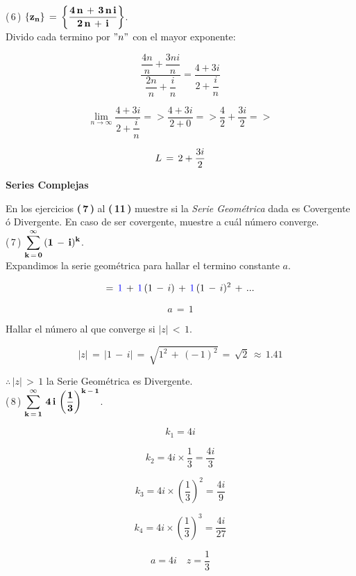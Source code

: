 \documentclass[a4paper,11pt,openany]{book}
\begin{document}
\textcolor{ao(english)}{(\,6\,)} $\bf{\{z_{n}\}\,=\,\left\{\dfrac{4\,n\,+\,3\,n\,i}{2\,n\,+\,i}\right\}}$.\\

Divido cada termino por $"n"$ con el mayor exponente:

$$\dfrac{\dfrac{4n}{n}+\dfrac{3ni}{n}}{\dfrac{2n}{n}+\dfrac{i}{n}} = \dfrac{ 4 +3i }{2+\dfrac{i}{n}} $$

$$\displaystyle\lim_{n \to \infty} \dfrac{ 4 +3i }{2+\dfrac{i}{n}} => \dfrac{ 4 +3i }{2+0} => \dfrac{4}{2}+\dfrac{3i}{2} =>  $$

$$\mathnormal{L}\,=\, 2+\dfrac{3i}{2}$$

\begin{center}
\textbf{Series Complejas}
\end{center}

En los ejercicios \textbf{(\,7\,)} al \textbf{(\,11\,)} muestre si la \textcolor{mint}{{\it Serie Geométrica}} dada es Covergente ó Divergente. En caso de ser covergente, muestre a cuál número converge.\\

\textcolor{ao(english)}{(\,7\,)} $\bf{\displaystyle\sum\limits_{k\,=\,0}^{\infty}\,(1\,-\,i)^{k}}$.\\

\textcolor{ao(english)}{} Expandimos la serie geométrica para hallar el termino constante $a$.

$$=\,\textcolor{blue}{1}\,+\,\textcolor{blue}{1}\,(1\,-\,i)\,+\,\textcolor{blue}{1}\,(1\,-\,i)^{2}\,+\,...$$

$$a\,=\,1$$

\textcolor{ao(english)}{} Hallar el número al que converge si $|z|\,<\,1$.

$$|z|\,=\,|1\,-\,i|\,=\,\sqrt{1^{2}\,+\,(-\,1)^{2}}\,=\,\sqrt{2}\,\approx\,1.41$$

$\therefore\,|z|\,>\,1$ la Serie Geométrica es Divergente.\\

\textcolor{ao(english)}{(\,8\,)} $\bf{\displaystyle\sum\limits_{k\,=\,1}^{\infty}\,4\,i\,\left(\dfrac{1}{3}\right)^{k\,-\,1}}$.

$$k_{1}=4i $$

$$k_{2}=4i \times \dfrac{1}{3} = \dfrac{4i}{3}$$

$$k_{3}=4i \times \left(\dfrac{1}{3} \right)^{2} = \dfrac{4i}{9} $$

$$k_{4}=4i \times \left(\dfrac{1}{3} \right)^{3} = \dfrac{4i}{27} $$

$$ a=4i \quad z=\dfrac{1}{3} $$
\end{document}
